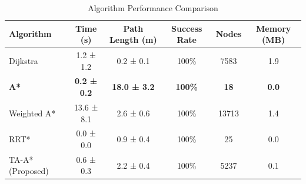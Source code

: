 
\begin{table}[h]
\centering
\caption{Algorithm Performance Comparison}
\label{tab:algorithm_comparison}
\begin{tabular}{lccccc}
\hline
Algorithm & Time (s) & Path Length (m) & Success Rate & Nodes & Memory (MB) \\
\hline
Dijkstra & 1.2 ± 1.2 & 0.2 ± 0.1 & 100\% & 7583 & 1.9 \\
\textbf{A*} & \textbf{0.2 ± 0.2} & \textbf{18.0 ± 3.2} & \textbf{100\%} & \textbf{18} & \textbf{0.0} \\
Weighted A* & 13.6 ± 8.1 & 2.6 ± 0.6 & 100\% & 13713 & 1.4 \\
RRT* & 0.0 ± 0.0 & 0.9 ± 0.4 & 100\% & 25 & 0.0 \\
TA-A* (Proposed) & 0.6 ± 0.3 & 2.2 ± 0.4 & 100\% & 5237 & 0.1 \\

\hline
\end{tabular}
\end{table}
